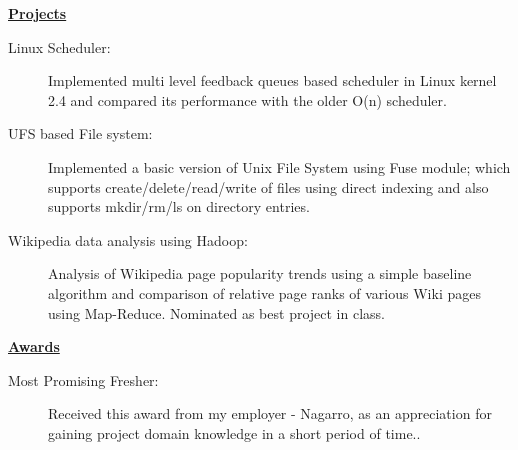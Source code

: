 \documentclass[letterpaper,11pt]{article}
\newcommand{\resheading}[1]{{\large \colorbox{mygrey}{\begin{minipage}{\textwidth}{\textbf{#1 \vphantom{p\^{E}}}}\end{minipage}}}}
\begin{document}
\resheading{\href{http://www.ashish-jindal.com/}{Projects}}

\begin{description}
\item[Linux Scheduler:] { \footnotesize Implemented multi level feedback queues based scheduler in Linux kernel 2.4 and compared its performance with the older O(n) scheduler.}

\item[UFS based File system:] { \footnotesize Implemented a basic version of Unix File System using Fuse module; which supports create/delete/read/write of files using direct indexing and also supports mkdir/rm/ls on directory entries.}

\item[Wikipedia data analysis using Hadoop:] { \footnotesize Analysis of Wikipedia page popularity trends using a simple baseline algorithm and comparison of relative page ranks of various Wiki pages using Map-Reduce. Nominated as best project in class.}
\end{description}

\resheading{\href{http://www.ashish-jindal.com/}{Awards}}

\begin{description}
\item[Most Promising Fresher:] { \footnotesize Received this award from my employer - Nagarro, as an appreciation for gaining project domain knowledge in a short period of time..}

\end{description}
\end{document}
